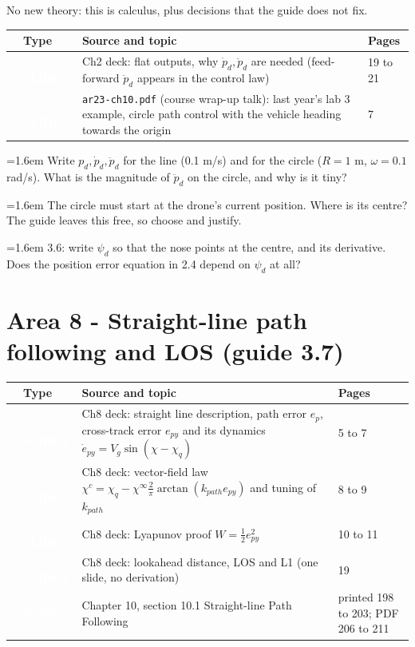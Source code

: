 \documentclass[10pt,a4paper]{article}
\newcommand{\cb}{\raisebox{-0.35ex}{\Large$\square$}}
\newcommand{\srctag}[2]{\colorbox{#1}{\textcolor{white}{\textbf{\scriptsize\,#2\,}}}}
\newcommand{\SLIDES}{\srctag{slides}{SLIDES}}
\newcommand{\BOOK}{\srctag{book}{BOOK}}
\newcommand{\chk}[1]{\par\noindent\hangindent=1.6em\hangafter=1 \cb\hspace{0.6em}#1}
\begin{document}
No new theory: this is calculus, plus decisions that the guide does not fix.

\begin{tabularx}{\textwidth}{@{}C T X l@{}}
\toprule
\cb & Type & Source and topic & Pages\\
\midrule
\cb & \SLIDES & Ch2 deck: flat outputs, why $\dot p_d,\ddot p_d$ are needed (feed-forward $\ddot p_d$ appears in the control law) & 19 to 21\\
\cb & \SLIDES & \texttt{ar23-ch10.pdf} (course wrap-up talk): last year's lab 3 example, circle path control with the vehicle heading towards the origin & 7\\
\bottomrule
\end{tabularx}
\begin{selfcheck}
\chk{Write $p_d,\dot p_d,\ddot p_d$ for the line (0.1 m/s) and for the circle ($R=1$ m, $\omega=0.1$ rad/s). What is the magnitude of $\ddot p_d$ on the circle, and why is it tiny?}
\chk{The circle must start at the drone's current position. Where is its centre? The guide leaves this free, so choose and justify.}
\chk{3.6: write $\psi_d$ so that the nose points at the centre, and its derivative. Does the position error equation in 2.4 depend on $\psi_d$ at all?}
\end{selfcheck}

\section*{Area 8 - Straight-line path following and LOS \hfill\normalfont\small (guide 3.7)}

\begin{tabularx}{\textwidth}{@{}C T X l@{}}
\toprule
\cb & Type & Source and topic & Pages\\
\midrule
\cb & \SLIDES & Ch8 deck: straight line description, path error $e_p$, cross-track error $e_{py}$ and its dynamics $\dot e_{py}=V_g\sin(\chi-\chi_q)$ & 5 to 7\\
\cb & \SLIDES & Ch8 deck: vector-field law $\chi^c=\chi_q-\chi^\infty\tfrac{2}{\pi}\arctan(k_{path}e_{py})$ and tuning of $k_{path}$ & 8 to 9\\
\cb & \SLIDES & Ch8 deck: Lyapunov proof $W=\tfrac12 e_{py}^2$ & 10 to 11\\
\cb & \SLIDES & Ch8 deck: lookahead distance, LOS and L1 (one slide, no derivation) & 19\\
\cb & \BOOK & Chapter 10, section 10.1 Straight-line Path Following & printed 198 to 203; PDF 206 to 211\\
\bottomrule
\end{tabularx}
\end{document}
